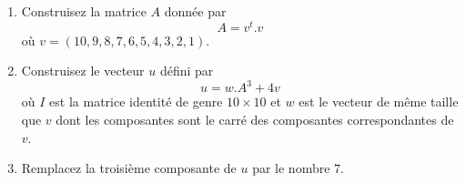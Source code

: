 \begin{exercice}\label{exoMatlab0030}

\begin{enumerate}
\item Construisez la matrice $A$ donnée par
\[ A=v^t.v \]
où $v=(10, 9, 8, 7, 6, 5, 4, 3, 2, 1)$.
\item Construisez le vecteur $u$ défini par
\[ u= w.A^3 + 4v \]
où $I$ est la matrice identité de genre $10\times 10$ et $w$ est le vecteur de même taille que $v$ dont les composantes sont le carré des composantes correspondantes de $v$.
\item Remplacez la troisième composante de $u$ par le nombre $7$.
\end{enumerate}

\end{exercice}
